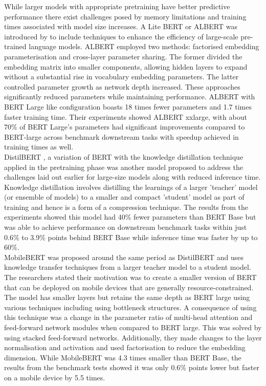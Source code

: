 While larger models with appropriate pretraining have better predictive performance \cite{devlinBERTPretrainingDeep2018, liuRoBERTaRobustlyOptimized2019} there exist challenges posed by memory limitations and training times associated with model size increases. A Lite BERT or ALBERT was introduced by \cite{lanALBERTLiteBERT2020} to include techniques to enhance the efficiency of large-scale pre-trained language models. ALBERT employed two methods: factorised embedding parameterisation and cross-layer parameter sharing. The former divided the embedding matrix into smaller components, allowing hidden layers to expand without a substantial rise in vocabulary embedding parameters. The latter controlled parameter growth as network depth increased. These approaches significantly reduced parameters while maintaining performance. ALBERT with BERT Large like configuration boasts 18 times fewer parameters and 1.7 times faster training time. Their experiments showed ALBERT xxlarge, with about 70\% of BERT Large's parameters had significant improvements compared to BERT-large across benchmark downstream tasks with speedup achieved in training times as well.\\

DistilBERT \cite{sanhDistilBERTDistilledVersion2020}, a variation of BERT with the knowledge distillation technique applied in the pretraining phase was another model proposed to address the challenges laid out earlier for large-size models along with reduced inference time. Knowledge distillation involves distilling the learnings of a larger 'teacher' model (or ensemble of models) to a smaller and compact 'student' model as part of training and hence is a form of a compression technique. The results from the experiments showed this model had 40\% fewer parameters than BERT Base but was able to achieve performance on downstream benchmark tasks within just 0.6\% to 3.9\% points behind BERT Base while inference time was faster by up to 60\%.\\

MobileBERT \cite{sunMobileBERTCompactTaskAgnostic2020} was proposed around the same period as DistilBERT and uses knowledge transfer techniques from a larger teacher model to a student model. The researchers stated their motivation was to create a smaller version of BERT that can be deployed on mobile devices that are generally resource-constrained. The model has smaller layers but retains the same depth as BERT large using various techniques including using bottleneck structures. A consequence of using this technique was a change in the parameter ratio of multi-head attention and feed-forward network modules when compared to BERT large. This was solved by using stacked feed-forward networks. Additionally, they made changes to the layer normalisation and activation and used factorisation to reduce the embedding dimension. While MobileBERT was 4.3 times smaller than BERT Base, the results from the benchmark tests showed it was only 0.6\% points lower but faster on a mobile device by 5.5 times.\\

